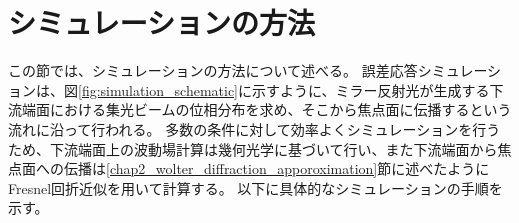 \clearpage
\newpage


\section{シミュレーションの方法}
\label{chap2_simulation_methodology}

この節では、シミュレーションの方法について述べる。
誤差応答シミュレーションは、図\ref{fig:simulation_schematic}に示すように、ミラー反射光が生成する下流端面における集光ビームの位相分布を求め、そこから焦点面に伝播するという流れに沿って行われる。
多数の条件に対して効率よくシミュレーションを行うため、下流端面上の波動場計算は幾何光学に基づいて行い、また下流端面から焦点面への伝播は\ref{chap2_wolter_diffraction_apporoximation}節に述べたようにFresnel回折近似を用いて計算する。
以下に具体的なシミュレーションの手順を示す。

